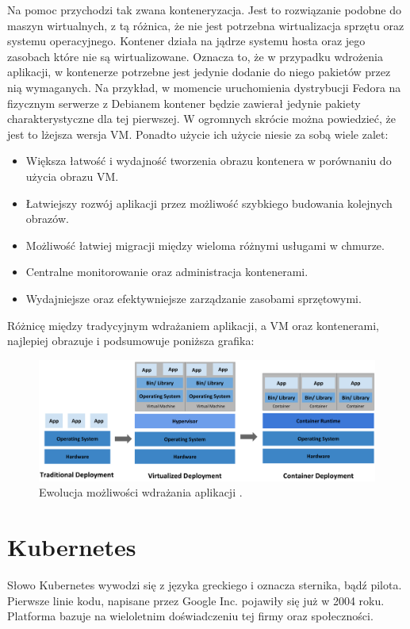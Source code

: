 \documentclass[pl,final,oneside]{mgr} %
\begin{document}
Na pomoc przychodzi tak zwana konteneryzacja. Jest to rozwiązanie podobne do maszyn wirtualnych, z tą różnica, że nie jest potrzebna wirtualizacja sprzętu oraz systemu operacyjnego. Kontener działa na jądrze systemu hosta oraz jego zasobach które nie są wirtualizowane. Oznacza to, że w przypadku wdrożenia aplikacji, w kontenerze potrzebne jest jedynie dodanie do niego pakietów przez nią wymaganych. Na przykład, w momencie uruchomienia dystrybucji Fedora na fizycznym serwerze z Debianem kontener będzie zawierał jedynie pakiety charakterystyczne dla tej pierwszej. W ogromnych skrócie można powiedzieć, że jest to lżejsza wersja VM. Ponadto użycie ich użycie niesie za sobą wiele zalet:
\begin{itemize}
	\item Większa łatwość i wydajność tworzenia obrazu kontenera w porównaniu do użycia obrazu VM.
	\item Łatwiejszy rozwój aplikacji przez możliwość szybkiego budowania kolejnych obrazów.
	\item Możliwość łatwiej migracji między wieloma różnymi usługami w chmurze.
	\item Centralne monitorowanie oraz administracja kontenerami.
	\item Wydajniejsze oraz efektywniejsze zarządzanie zasobami sprzętowymi.
	
\end{itemize}
Różnicę między tradycyjnym wdrażaniem aplikacji, a VM oraz kontenerami, najlepiej obrazuje i podsumowuje poniższa grafika: 
\begin{figure}[h!]
	\centering
	\includegraphics[width=1\linewidth]{images/container_evolution}
	\caption{Ewolucja możliwości wdrażania aplikacji \cite{kube_doku}.}
	\label{fig:container_evolution}
\end{figure}
\section{Kubernetes}
Słowo Kubernetes wywodzi się z języka greckiego i oznacza sternika, bądź pilota. Pierwsze linie kodu, napisane przez Google Inc. pojawiły się już w 2004 roku. Platforma bazuje na wieloletnim doświadczeniu tej firmy oraz społeczności.
\end{document}
